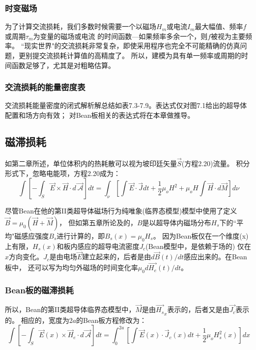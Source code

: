 \subsubsection*{时变磁场}
为了计算交流损耗，我们多数时候需要一个以磁场$H_m$或电流$I_m$最大幅值、频率$f$或周期$\tau_m$为变量的磁场或电流
的时间函数---如果频率多余一个，则$f$被视为主要频率。
``现实世界"的交流损耗非常复杂，即使采用程序也完全不可能精确的仿真问题，更别提交流损耗计算值的高精度了。
所以，建模为具有单一频率或周期的时间函数足够了，尤其是对粗略估算。

\subsubsection*{交流损耗的能量密度表}
交流损耗能量密度的闭式解析解总结如表7.3-7.9。表达式仅对图7.1给出的超导体配置和场方向有效；
对Bean板相关的表达式将在本章做推导。

\subsection{磁滞损耗}
如第二章所述，单位体积内的热耗散可以视为坡印廷矢量$\vec{S}$(方程2.20)流量。
积分形式下，忽略电能项，方程2.20成为：
\begin{equation}%
\int\left[-\int_{S}^{}\vec{E}\times\vec{H}\cdot d\vec{\ \mathcal{A}}\right]dt=\int_{\nu}^{}\left[\int\vec{E}\cdot\vec{J}dt+\frac{1}{2}\mu_oH^2+\mu_oH\int\vec{H}\cdot d\vec{M}\right]d\nu
\end{equation}

尽管Bean在他的第II类超导体磁场行为纯唯象(临界态模型)模型中使用了定义$\vec{B}=\mu_0(\vec{H}+\vec{M})$，
但如第五章所论及的，$B$是以超导体内磁场分布$H_s$下的``平均"磁感应强度$B_s$进行计算的，即$B_s(x)=\mu_0 H_s$。
因为Bean板仅在一个维度(x)上有限，$H_s(x)$和板内感应的超导电流密度$J_c$(Bean模型中，是依赖于场的)
仅在$x$方向变化。$J_c$是由电场$\vec{E}$建立起来的，后者是由$d\vec{B}(t)/dt$感应出来的。在Bean板中，
还可以写为均匀外磁场的时间变化率$\mu_0 d\vec{H_e}(t)/dt$。

\subsubsection*{Bean板的磁滞损耗}
所以，Bean的第II类超导体临界态模型中，$\vec{M}$是由$\vec{H_s}_x$表示的，后者又是由$\vec{J_c}$表示的。
相应的，宽度为$2a$的Bean板方程修改为：
\begin{equation}%
\int\left[-\int_{S}\vec{E}(x)\times\vec{H}_e\cdot d\vec{\ \mathcal{A}}\right]dt=\int_{0}^{2a}\left[\int\vec{E}(x)\cdot\vec{J}_c(x)dt+\frac{1}{2}\mu_oH_{s}^{2}(x)\right]dx
\end{equation}


